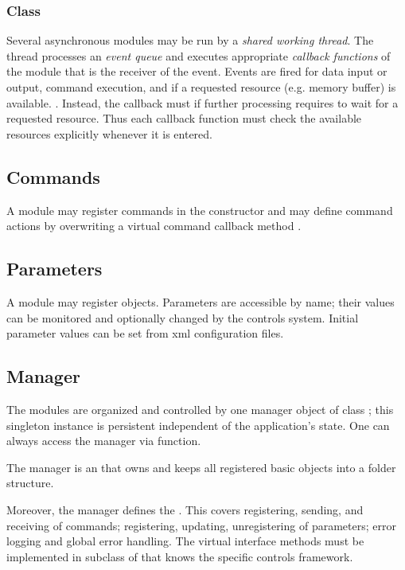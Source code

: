 \subsubsection{Class }
 Several asynchronous modules may be run by a {\sl shared working thread}. 
The thread processes an  {\sl event queue} and executes 
appropriate  {\sl callback functions} 
of the module that is the receiver of the event. Events are fired for data input 
or output, command execution, and if a requested resource (e.g. memory buffer) 
is available. . 
Instead, the callback must  if further processing requires 
to wait for a requested resource. Thus each callback function must check the 
available resources explicitly whenever it is entered.
           
\subsection{Commands}
A module may register commands in the constructor and may define 
command actions by overwriting a virtual command callback method .

\subsection{Parameters}
A module may register   objects. 
Parameters are accessible by name; their values can be monitored and optionally changed by 
the controls system. Initial parameter values can be set from xml configuration files.   

\subsection{Manager}
The modules are organized and controlled by one manager object of 
class ;
this singleton instance is persistent independent of the application's state.
One can always access the manager via  function.

The manager is an  that owns and keeps all 
registered basic objects into a folder structure. 

Moreover, the manager defines the . 
This covers registering, sending, and receiving of commands; registering, 
updating, unregistering of parameters; error logging and global error handling. 
The virtual interface methods must be implemented in subclass of  that 
knows the specific controls framework.

